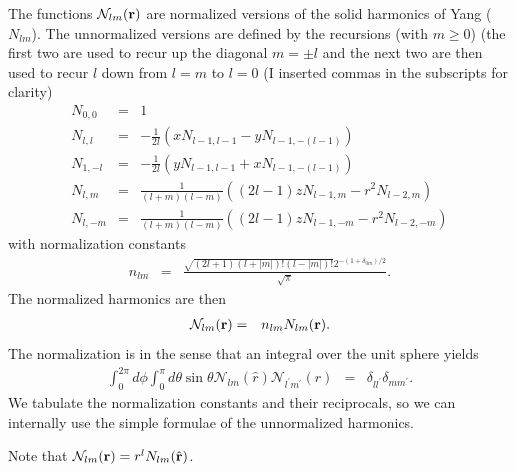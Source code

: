 \documentclass[12pt]{article}
\newcommand{\N}{\mathcal{N}}
\newcommand{\rv}{\vb{r}}
\newcommand{\rhat}{\hat{\rv}}
\begin{document}
The functions $\N_{lm}(\vb{r})$ are normalized versions of the solid harmonics of Yang ($N_{lm}$).  The unnormalized versions are defined by the recursions (with $m\ge 0$) (the first two are used to recur up the diagonal $m=\pm l$ and the next two are then used to recur $l$ down from $l=m$ to $l=0$ (I inserted commas in the subscripts for clarity)
\begin{eqnarray}
  N_{0,0} & = & 1 \\
  N_{l, l} & = & -\frac{1}{2 l} \left(x N_{l-1,l-1} - y N_{l - 1, -(l - 1)}\right) \\
  N_{1,-l} & = & -\frac{1}{2 l} \left(y N_{l-1,l-1} + x N_{l - 1, -(l - 1)}\right) \\ 
  N_{l, m} & = & \frac{1}{(l+m) (l-m)} \left((2 l-1) z N_{l-1, m}-r^2  N_{l-2, m} \right) \\
  N_{l, -m}& = & \frac{1}{(l+m) (l-m)} \left((2 l-1) z N_{l-1, -m}-r^2 N_{l-2, -m} \right) 
\end{eqnarray}
with normalization constants
\begin{eqnarray}
  n_{lm} & = & \frac{\sqrt{(2 l +1) \left(l +{| m |}\right)! \left(l -{| m |}\right)!}  2^{-(1 + \delta_{0 m})/2}}{\sqrt{\pi}} .
\end{eqnarray}
The normalized harmonics are then
\begin{eqnarray}
  \N_{lm}(\vb{r}) & = & n_{lm} N_{lm}(\vb{r}).
\end{eqnarray}
The normalization is in the sense that an integral over the unit sphere yields
\begin{eqnarray}
  \int_0^{2 \pi} d\phi \int_0^\pi d\theta \sin \theta  \N_{lm} (\hat{r}) \N_{l^\prime m^\prime}(\hat{r})  & = & \delta_{l l^\prime} \delta_{m m^\prime} .
\end{eqnarray}
We tabulate the normalization constants and their reciprocals, so we can internally use the simple formulae of the unnormalized harmonics.

Note that $\N_{lm}(\vb{r}) = r^l N_{lm}(\rhat)$.
\end{document}
